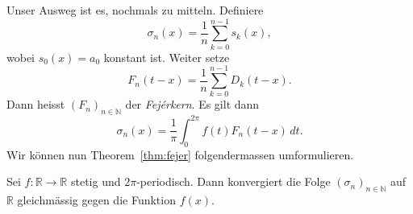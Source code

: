 \documentclass[../main.tex]{subfiles}
\begin{document}
Unser Ausweg ist es, nochmals zu mitteln.
Definiere
\[
  \sigma_n(x) = \frac{1}{n} \sum_{k=0}^{n-1} s_k(x),
\]
wobei
\(
  s_0(x) = a_0
\)
konstant ist.
Weiter setze
\[
  F_n(t - x) = \frac{1}{n} \sum_{k=0}^{n-1} D_k(t-x).
\]
Dann heisst ${(F_{n})}_{n \in \mathbb{N}}$ der \emph{Fejérkern}.
Es gilt dann
\[
  \sigma_n(x) = \frac{1}{\pi} \int_{0}^{2\pi} f(t)
  F_n (t-x)\, dt.
\]
Wir können nun Theorem~\ref{thm:fejer} folgendermassen
umformulieren.

\begin{theorem*}[Fejér]
  Sei $f \colon \mathbb{R} \to \mathbb{R}$ 
  stetig und $2\pi$-periodisch. Dann konvergiert
  die Folge ${(\sigma_{n})}_{n \in \mathbb{N}}$ 
  auf $\mathbb{R}$ gleichmässig gegen
  die Funktion $f(x)$.
\end{theorem*}
\end{document}
